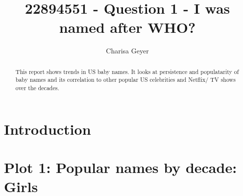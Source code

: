 \documentclass[11pt,preprint]{elsarticle}
\numberwithin{equation}{section}
\numberwithin{figure}{section}
\numberwithin{table}{section}
\begin{document}
\begin{frontmatter}  %

\title{22894551 - Question 1 - I was named after WHO?}





\author[Add1]{Charisa Geyer}





\address[Add1]{Stellenbosch University, Cape Town, South Africa}


\begin{abstract}
\small{
This report shows trends in US baby names. It looks at persistence and
populatarity of baby names and its correlation to other popular US
celebrities and Netflix/ TV shows over the decades.
}
\end{abstract}

\vspace{1cm}





\vspace{0.5cm}

\end{frontmatter}

\setcounter{footnote}{0}



\pagestyle{fancy}
\chead{}
\rhead{}
\lfoot{}
\lhead{}
\cfoot{}


\headsep 35pt %




\section{\texorpdfstring{Introduction
\label{Introduction}}{Introduction }}\label{introduction}

\section{Plot 1: Popular names by decade:
Girls}\label{plot-1-popular-names-by-decade-girls}
\end{document}
